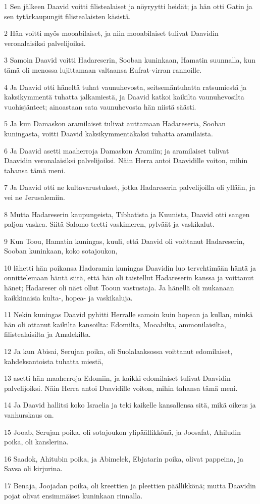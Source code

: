 \par 1 Sen jälkeen Daavid voitti filistealaiset ja nöyryytti heidät; ja hän otti Gatin ja sen tytärkaupungit filistealaisten käsistä.
\par 2 Hän voitti myös mooabilaiset, ja niin mooabilaiset tulivat Daavidin veronalaisiksi palvelijoiksi.
\par 3 Samoin Daavid voitti Hadareserin, Sooban kuninkaan, Hamatin suunnalla, kun tämä oli menossa lujittamaan valtaansa Eufrat-virran rannoille.
\par 4 Ja Daavid otti häneltä tuhat vaunuhevosta, seitsemäntuhatta ratsumiestä ja kaksikymmentä tuhatta jalkamiestä, ja Daavid katkoi kaikilta vaunuhevosilta vuohisjänteet; ainoastaan sata vaunuhevosta hän niistä säästi.
\par 5 Ja kun Damaskon aramilaiset tulivat auttamaan Hadareseria, Sooban kuningasta, voitti Daavid kaksikymmentäkaksi tuhatta aramilaista.
\par 6 Ja Daavid asetti maaherroja Damaskon Aramiin; ja aramilaiset tulivat Daavidin veronalaisiksi palvelijoiksi. Näin Herra antoi Daavidille voiton, mihin tahansa tämä meni.
\par 7 Ja Daavid otti ne kultavarustukset, jotka Hadareserin palvelijoilla oli yllään, ja vei ne Jerusalemiin.
\par 8 Mutta Hadareserin kaupungeista, Tibhatista ja Kuunista, Daavid otti sangen paljon vaskea. Siitä Salomo teetti vaskimeren, pylväät ja vaskikalut.
\par 9 Kun Toou, Hamatin kuningas, kuuli, että Daavid oli voittanut Hadareserin, Sooban kuninkaan, koko sotajoukon,
\par 10 lähetti hän poikansa Hadoramin kuningas Daavidin luo tervehtimään häntä ja onnittelemaan häntä siitä, että hän oli taistellut Hadareserin kanssa ja voittanut hänet; Hadareser oli näet ollut Tooun vastustaja. Ja hänellä oli mukanaan kaikkinaisia kulta-, hopea- ja vaskikaluja.
\par 11 Nekin kuningas Daavid pyhitti Herralle samoin kuin hopean ja kullan, minkä hän oli ottanut kaikilta kansoilta: Edomilta, Mooabilta, ammonilaisilta, filistealaisilta ja Amalekilta.
\par 12 Ja kun Abisai, Serujan poika, oli Suolalaaksossa voittanut edomilaiset, kahdeksantoista tuhatta miestä,
\par 13 asetti hän maaherroja Edomiin, ja kaikki edomilaiset tulivat Daavidin palvelijoiksi. Näin Herra antoi Daavidille voiton, mihin tahansa tämä meni.
\par 14 Ja Daavid hallitsi koko Israelia ja teki kaikelle kansallensa sitä, mikä oikeus ja vanhurskaus on.
\par 15 Jooab, Serujan poika, oli sotajoukon ylipäällikkönä, ja Joosafat, Ahiludin poika, oli kanslerina.
\par 16 Saadok, Ahitubin poika, ja Abimelek, Ebjatarin poika, olivat pappeina, ja Savsa oli kirjurina.
\par 17 Benaja, Joojadan poika, oli kreettien ja pleettien päällikkönä; mutta Daavidin pojat olivat ensimmäiset kuninkaan rinnalla.

